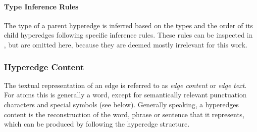 \documentclass[11pt]{scrreprt}
\let\citef\cite  %
\let\cite\parencite  %
\begin{document}

\paragraph{Type Inference Rules}
The type of a parent hyperedge is inferred based on the types and the order of its child hyperedges following specific inference rules. These rules can be inspected in \citef[p. 8]{menezesSemanticHypergraphs2021}, but are omitted here, because they are deemed mostly irrelevant for this work.


\subsubsection{Hyperedge Content}
The textual representation of an edge is referred to as \textit{edge content} or \textit{edge text}. For atoms this is generally a word, except for semantically relevant punctuation characters and special symbols (see below). Generally speaking, a hyperedges content is the reconstruction of the word, phrase or sentence that it represents, which can be produced by following the hyperedge structure.
\end{document}
